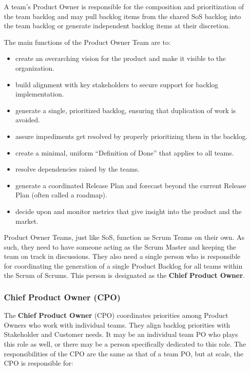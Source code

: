 \documentclass[12pt,a4paper,parskip=full]{scrartcl}
\begin{document}
A team's Product Owner is responsible for the composition and prioritization of the team backlog and may pull backlog items from the shared SoS backlog into the team backlog or generate independent backlog items at their discretion.

The main functions of the Product Owner Team are to:

\begin{itemize}
	\item create an overarching vision for the product and make it visible to the organization.
	\item build alignment with key stakeholders to secure support for backlog implementation.
	\item generate a single, prioritized backlog, ensuring that duplication of work is avoided.
	\item assure impediments get resolved by properly prioritizing them in the backlog.
	\item create a minimal, uniform ``Definition of Done'' that applies to all teams.
	\item resolve dependencies raised by the teams.
	\item generate a coordinated Release Plan and forecast beyond the current Release Plan (often called a roadmap).
	\item decide upon and monitor metrics that give insight into the product and the market.
\end{itemize}

Product Owner Teams, just like SoS, function as Scrum Teams on their own. As such, they need to have someone acting as the Scrum Master and keeping the team on track in discussions. They also need a single person who is responsible for coordinating the generation of a single Product Backlog for all teams within the Scrum of Scrums. This person is designated as the \textbf{Chief Product Owner}.

\subsubsection{Chief Product Owner (CPO)}

The \textbf{Chief Product Owner} (CPO) coordinates priorities among Product Owners who work with individual teams. They align backlog priorities with Stakeholder and Customer needs. It may be an individual team PO who plays this role as well, or there may be a person specifically dedicated to this role. The responsibilities of the CPO are the same as that of a team PO, but at scale, the CPO is responsible for:
\end{document}

